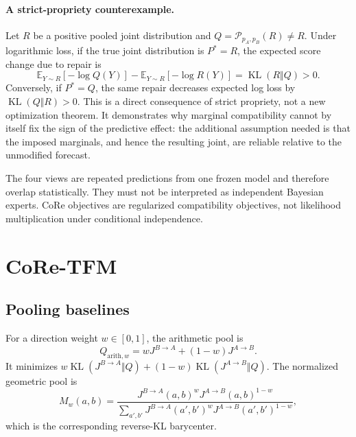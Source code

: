 \documentclass[a4paper,fleqn]{cas-sc}
\newcommand{\KL}{\operatorname{KL}}
\newcommand{\E}{\mathbb{E}}
\newcommand{\Jone}{J^{B\rightarrow A}}
\newcommand{\Jtwo}{J^{A\rightarrow B}}
\begin{document}
\paragraph{A strict-propriety counterexample.}
Let $R$ be a positive pooled joint distribution and $Q=\mathcal{P}_{p_A,p_B}(R)\ne R$. Under logarithmic loss, if the true joint distribution is $P^*=R$, the expected score change due to repair is
\begin{equation}
\E_{Y\sim R}[-\log Q(Y)]-\E_{Y\sim R}[-\log R(Y)]
=\KL(R\Vert Q)>0.
\end{equation}
Conversely, if $P^*=Q$, the same repair decreases expected log loss by $\KL(Q\Vert R)>0$. This is a direct consequence of strict propriety, not a new optimization theorem. It demonstrates why marginal compatibility cannot by itself fix the sign of the predictive effect: the additional assumption needed is that the imposed marginals, and hence the resulting joint, are reliable relative to the unmodified forecast.


The four views are repeated predictions from one frozen model and therefore overlap statistically. They must not be interpreted as independent Bayesian experts. CoRe objectives are regularized compatibility objectives, not likelihood multiplication under conditional independence.

\section{CoRe-TFM}
\subsection{Pooling baselines}
For a direction weight $w\in[0,1]$, the arithmetic pool is
\begin{equation}
Q_{\mathrm{arith},w}=w\Jone+(1-w)\Jtwo.
\end{equation}
It minimizes $w\KL(\Jone\Vert Q)+(1-w)\KL(\Jtwo\Vert Q)$. The normalized geometric pool is
\begin{equation}
M_w(a,b)=\frac{\Jone(a,b)^w\Jtwo(a,b)^{1-w}}
{\sum_{a',b'}\Jone(a',b')^w\Jtwo(a',b')^{1-w}},
\end{equation}
which is the corresponding reverse-KL barycenter.
\end{document}
